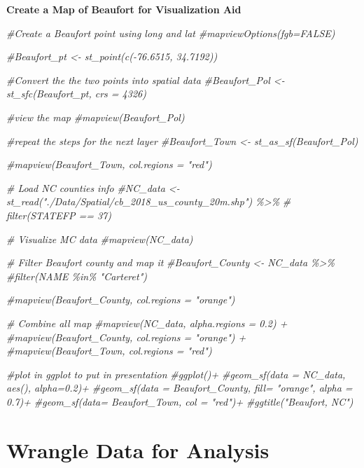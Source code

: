 \documentclass[
  12pt,
]{article}
\newenvironment{Shaded}{\begin{snugshade}}{\end{snugshade}}
\newcommand{\CommentTok}[1]{\textcolor[rgb]{0.56,0.35,0.01}{\textit{#1}}}
\begin{document}
\textbf{Create a Map of Beaufort for Visualization Aid}

\begin{Shaded}
\begin{Highlighting}[]
\CommentTok{\#Create a Beaufort point using long and lat }
\CommentTok{\#mapviewOptions(fgb=FALSE)}

\CommentTok{\#Beaufort\_pt \textless{}{-}  st\_point(c({-}76.6515, 34.7192))}

\CommentTok{\#Convert the the two points into spatial data}
\CommentTok{\#Beaufort\_Pol \textless{}{-} st\_sfc(Beaufort\_pt, crs = 4326)}

\CommentTok{\#view the map}
\CommentTok{\#mapview(Beaufort\_Pol)}

\CommentTok{\#repeat the steps for the next layer}
\CommentTok{\#Beaufort\_Town \textless{}{-} st\_as\_sf(Beaufort\_Pol)}

\CommentTok{\#mapview(Beaufort\_Town, col.regions = "red")}

\CommentTok{\# Load NC counties info }
\CommentTok{\#NC\_data \textless{}{-} st\_read("./Data/Spatial/cb\_2018\_us\_county\_20m.shp") \%\textgreater{}\% }
 \CommentTok{\# filter(STATEFP == 37)}

\CommentTok{\# Visualize MC data}
\CommentTok{\#mapview(NC\_data)}

\CommentTok{\# Filter Beaufort county and map it }
\CommentTok{\#Beaufort\_County \textless{}{-} NC\_data \%\textgreater{}\% }
  \CommentTok{\#filter(NAME \%in\% "Carteret")}

\CommentTok{\#mapview(Beaufort\_County, col.regions = "orange")}

\CommentTok{\# Combine all map }
\CommentTok{\#mapview(NC\_data, alpha.regions = 0.2) +}
  \CommentTok{\#mapview(Beaufort\_County, col.regions = "orange") +}
  \CommentTok{\#mapview(Beaufort\_Town, col.regions = "red")}

\CommentTok{\#plot in ggplot to put in presentation }
\CommentTok{\#ggplot()+}
  \CommentTok{\#geom\_sf(data = NC\_data, aes(), alpha=0.2)+}
  \CommentTok{\#geom\_sf(data = Beaufort\_County, fill= "orange", alpha = 0.7)+}
  \CommentTok{\#geom\_sf(data= Beaufort\_Town, col = "red")+}
  \CommentTok{\#ggtitle("Beaufort, NC")}
\end{Highlighting}
\end{Shaded}

\hypertarget{wrangle-data-for-analysis}{%
\section{Wrangle Data for Analysis}\label{wrangle-data-for-analysis}}
\end{document}
